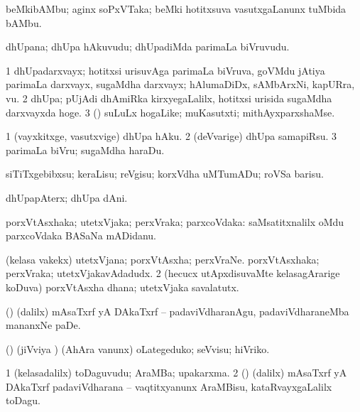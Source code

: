 \bentry
{}
\gl{\nA}
\bmng
beMkibAMbu; aginx soPxVTaka; beMki hotitxsuva vasutxgaLanunx tuMbida bAMbu. 
\emng
\eentry

\bentry
{}
\gl{\nA}
\bmng
dhUpana; dhUpa hAkuvudu; dhUpadiMda parimaLa biVruvudu. 
\emng
\eentry

\bentry
{}
\gl{\nA}
\bmng
\bnum
\num{1} dhUpadarxvayx; hotitxsi urisuvAga parimaLa biVruva, goVMdu jAtiya parimaLa darxvayx, sugaMdha darxvayx; hAlumaDiDx, sAMbArxNi, kapURra, \mo vu. 
\num{2} dhUpa; pUjAdi dhAmiRka kirxyegaLalilx, hotitxsi urisida sugaMdha darxvayxda hoge. 
\num{3} (\rUpa) suLuLx hogaLike; muKasutxti; mithAyxparxshaMse. 
\enum
\emng
\eentry


\bentry
{}
\gl{\sakirx}
\bmng
\bnum
\num{1} (vayxkitxge, vasutxvige) dhUpa hAku. 
\num{2} (deVvarige) dhUpa samapiRsu. 
\num{3} parimaLa biVru; sugaMdha haraDu. 
\enum
\emng
\eentry

\bentry
{}
\gl{\sakirx}
\bmng
siTiTxgebibxsu; keraLisu; reVgisu; korxVdha uMTumADu; roVSa barisu. 
\emng
\eentry

\bentry
{}
\gl{\nA}
\bmng
dhUpapAterx; dhUpa dAni. 
\emng
\eentry

\bentry
{}
\gl{\gu}
\bmng
porxVtAsxhaka; utetxVjaka; perxVraka; parxcoVdaka:  saMsatitxnalilx oMdu parxcoVdaka BASaNa mADidanu. 
\emng
\eentry

\bentry
{}
\gl{\nA}
\bmng
\bnum
{} (kelasa \mo vakekx) 
\banum
{} utetxVjana; porxVtAsxha; perxVraNe. 
 porxVtAsxhaka; perxVraka; utetxVjakavAdadudx. 
\eanum
\numie
\num{2} (hecucx utApxdisuvaMte kelasagArarige koDuva) porxVtAsxha dhana; utetxVjaka savalatutx. 
\enum
\emng
\eentry

\bentry
{}
\gl{\akirx}
\bmng
(\ca) (\vivi dalilx) mAsaTxrf yA DAkaTxrf -- padaviVdharanAgu, padaviVdharaneMba mananxNe paDe. 
\emng

\noindent
\gl{\sakirx}
\bmng
(\jiVvi) (jiVviya \vi) (AhAra \mo vanunx) oLategeduko; seVvisu; hiVriko. 
\emng
\eentry

\bentry
{}
\gl{\nA}
\bmng
\bnum
\num{1} (kelasadalilx) toDaguvudu; AraMBa; upakarxma. 
\num{2} (\ca) (\vivi dalilx) mAsaTxrf yA DAkaTxrf padaviVdharana -- vaqtitxyanunx AraMBisu, kataRvayxgaLalilx toDagu. 
\enum
\emng
\eentry

